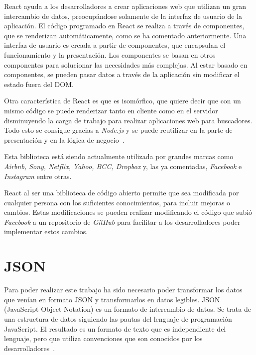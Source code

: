 \documentclass[a4paper, 12pt]{book}
\begin{document}
\vspace{5mm}
React ayuda a los desarrolladores a crear aplicaciones web que utilizan un gran intercambio de datos, preocupándose solamente de la interfaz de usuario de la aplicación. El código programado en React se realiza a través de componentes, que se renderizan automáticamente, como se ha comentado anteriormente. Una interfaz de usuario es creada a partir de componentes, que encapsulan el funcionamiento y la presentación. Los componentes se basan en otros componentes para solucionar las necesidades más complejas. Al estar basado en componentes, se pueden pasar datos a través de la aplicación sin modificar el estado fuera del DOM.

\vspace{5mm}
Otra característica de React es que es isomórfico, que quiere decir que con un mismo código se puede renderizar tanto en cliente como en el servidor disminuyendo la carga de trabajo para realizar aplicaciones web para buscadores. Todo esto se consigue gracias a \textit{Node.js} y se puede reutilizar en la parte de presentación y en la lógica de negocio~\cite{react_manual}.

\vspace{5mm}
Esta biblioteca está siendo actualmente utilizada por grandes marcas como \textit{Airbnb, Sony, Netflix, Yahoo, BCC, Dropbox} y, las ya comentadas, \textit{Facebook} e \textit{Instagram} entre otras.


\vspace{5mm}
React al ser una biblioteca de código abierto permite que sea modificada por cualquier persona con los suficientes conocimientos, para incluir mejoras o cambios. Estas modificaciones se pueden realizar modificando el código que subió \textit{Facebook} a un repositorio de \textit{GitHub} para facilitar a los desarrolladores poder implementar estos cambios.



\section{JSON}
\label{subsec:json}
Para poder realizar este trabajo ha sido necesario poder transformar los datos que venían en formato JSON y transformarlos en datos legibles. JSON (JavaScript Object Notation) es un formato de intercambio de datos. Se trata de una estructura de datos siguiendo las pautas del lenguaje de programación JavaScript. El resultado es un formato de texto que es independiente del lenguaje, pero que utiliza convenciones que son conocidos por los desarrolladores~\cite{json_misc}.
\end{document}
